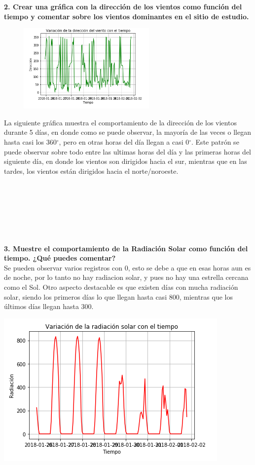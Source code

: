 \documentclass[12pt]{article}
\begin{document}
\noindent\textbf {2. Crear una gráfica con la dirección de los vientos como función del tiempo y comentar sobre los vientos dominantes en el sitio de estudio.} \\
\begin{figure}
    \centering
    \includegraphics[width=0.6\textwidth]{DirVi.png}
\end{figure}
La siguiente gráfica muestra el comportamiento de la dirección de los vientos durante 5 días, en donde como se puede observar, la mayoría de las veces o llegan hasta casi los 360$^{\circ}$, pero en otras horas del día llegan a casi 0$^{\circ}$. Este patrón se puede observar sobre todo entre las ultimas horas del día y las primeras horas del siguiente día, en donde los vientos son dirigidos hacia el sur, mientras que en las tardes, los vientos están dirigidos hacia el norte/noroeste.\\ \\ \\ \\ \\ \\ \\ \\


\noindent\textbf {3. Muestre el comportamiento de la Radiación Solar como función del tiempo. ¿Qué puedes comentar? } \\
Se pueden observar varios registros con 0, esto se debe a que en esas horas aun es de noche, por lo tanto no hay radiacion solar, y pues no hay una estrella cercana como el Sol. Otro aspecto destacable es que existen días con mucha radiación solar, siendo los primeros días lo que llegan hasta casi 800, mientras que los últimos días llegan hasta 300.

\begin{center}
\includegraphics[scale=0.65]{RadSol.png}
\end{center}
\end{document}
